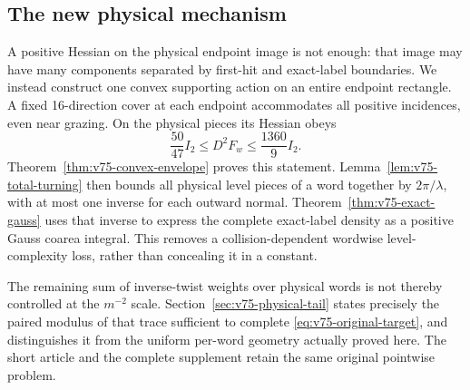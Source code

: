 \documentclass[11pt,reqno]{amsart}
\numberwithin{equation}{section}
\theoremstyle{definition}
\theoremstyle{remark}\newtheorem{remark}[theorem]{Remark}
\begin{document}
\subsection{The new physical mechanism}
A positive Hessian on the physical endpoint image is not enough:
that image may have many components separated by first-hit and
exact-label boundaries. We instead construct one convex supporting
action on an entire endpoint rectangle. A fixed 16-direction cover
at each endpoint accommodates all positive incidences, even near
grazing. On the physical pieces its Hessian obeys
\[
            \frac{50}{47}I_2\le D^2F_w\le\frac{1360}{9}I_2.
\]
Theorem~\ref{thm:v75-convex-envelope} proves this statement.
Lemma~\ref{lem:v75-total-turning} then bounds all physical level
pieces of a word together by $2\pi/\lambda$, with at most one
inverse for each outward normal. Theorem~\ref{thm:v75-exact-gauss}
uses that inverse to express the complete exact-label density as a
positive Gauss coarea integral. This removes a collision-dependent
wordwise level-complexity loss, rather than concealing it in a
constant.

The remaining sum of inverse-twist weights over physical words is
not thereby controlled at the $m^{-2}$ scale. Section~\ref{sec:v75-physical-tail}
states precisely the paired modulus of that trace sufficient to
complete \eqref{eq:v75-original-target}, and distinguishes it from
the uniform per-word geometry actually proved here. The short
article and the complete supplement retain the same original
pointwise problem.





\end{document}
